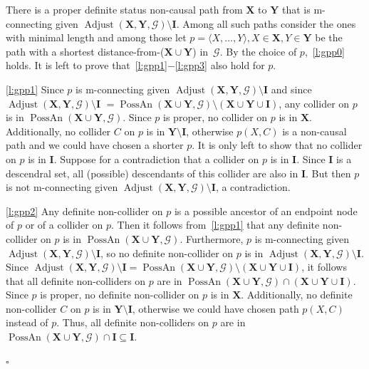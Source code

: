 \documentclass[11pt,a4paper]{article}
\newenvironment{proofof}[1][]{\begin{trivlist}
   \item[\hskip \labelsep {\bfseries Proof of #1.}]}{\hfill{}$\square$\end{trivlist}}
\DeclareMathOperator{\PossAn}{PossAn}
\DeclareMathOperator{\Adjust}{Adjust}
\newcommand{\g}[1][G]{\mathcal{#1}}
\newcommand{\adjustb}[2][X,Y]{\Adjust(\mathbf{#1},#2)}
\begin{document}
\begin{proofof}[Lemma~\ref{lemma:general path proof}]
There is a proper definite status non-causal path from $\mathbf{X}$ to $\mathbf{Y}$ that is m-connecting given $\adjustb{\g} \setminus \mathbf{I} $. Among all such paths consider the ones with minimal length and among those let $p = \langle X, \dots,Y \rangle, X \in \mathbf{X}, Y \in \mathbf{Y}$ be the path with a shortest distance-from-($\mathbf{\mathbf{X} \cup \mathbf{Y}}$) in~$\g$.
By the choice of $p$,~\ref{l:gpp0} holds. It is left to prove that~\ref{l:gpp1}$-$\ref{l:gpp3} also hold for $p$.

\ref{l:gpp1} Since $p$ is m-connecting given $\adjustb{\g} \setminus \mathbf{I}$ and since $\adjustb{\g} \setminus \mathbf{I}$ $=\PossAn(\mathbf{X} \cup \mathbf{Y}, \g) \setminus (\mathbf{X} \cup \mathbf{Y} \cup \mathbf{I})$, any collider on $p$ is in $\PossAn(\mathbf{X} \cup \mathbf{Y}, \g)$. Since $p$ is proper, no collider on $p$ is in $\mathbf{X}$. Additionally, no collider $C$ on $p$ is in $\mathbf{Y} \setminus \mathbf{I}$, otherwise $p(X,C)$ is a non-causal path and we could have chosen a shorter $p$.
It is only left to show that no collider on $p$ is in $\mathbf{I}$. Suppose for a contradiction that a collider on $p$ is in $\mathbf{I}$. Since $\mathbf{I}$ is a descendral set, all (possible) descendants of this collider are also in $\mathbf{I}$. But then $p$ is not m-connecting given $\adjustb{\g} \setminus \mathbf{I}$, a contradiction.

\ref{l:gpp2} Any definite non-collider on $p$ is a possible ancestor of an endpoint node of $p$ or of a collider on $p$. Then it follows from~\ref{l:gpp1} that any definite non-collider on $p$ is in $\PossAn(\mathbf{X} \cup \mathbf{Y}, \g)$. Furthermore, $p$ is m-connecting given $\adjustb{\g} \setminus \mathbf{I}$, so no definite non-collider on $p$ is in $\adjustb{\g} \setminus \mathbf{I}$. Since $\adjustb{\g} \setminus \mathbf{I}= \PossAn(\mathbf{X} \cup \mathbf{Y}, \g) \setminus (\mathbf{X} \cup \mathbf{Y} \cup \mathbf{I})$, it follows that all definite non-colliders on $p$ are in $\PossAn(\mathbf{X} \cup \mathbf{Y}, \g) \cap (\mathbf{X} \cup \mathbf{Y} \cup \mathbf{I})$. Since $p$ is proper, no definite non-collider on $p$ is in $\mathbf{X}$. Additionally, no definite non-collider $C$ on $p$ is in $\mathbf{Y} \setminus \mathbf{I}$, otherwise we could have chosen path $p(X,C)$ instead of $p$. Thus, all definite non-colliders on $p$ are in $\PossAn(\mathbf{X} \cup \mathbf{Y},\g) \cap \mathbf{I} \subseteq \mathbf{I}$.


\end{proofof}
\end{document}
